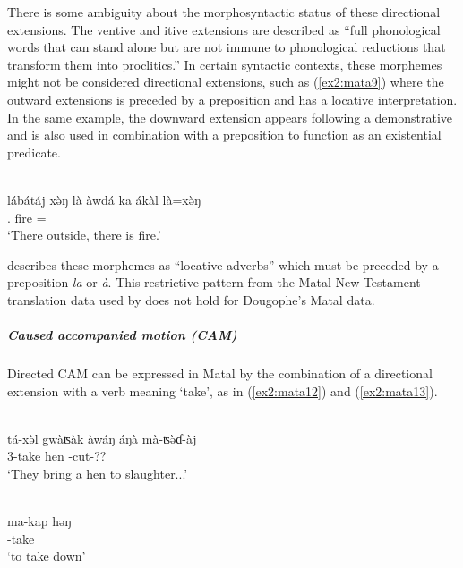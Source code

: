There is some ambiguity about the morphosyntactic status of these directional extensions. The ventive and itive extensions are described as ``full phonological words that can stand alone but are not immune to phonological reductions that transform them into proclitics.'' In certain syntactic contexts, these morphemes might not be considered directional extensions, such as (\ref{ex2:mata9}) where the outward extensions is preceded by a preposition and has a locative interpretation. In the same example, the downward extension appears following a demonstrative and is also used in combination with a preposition to function as an existential predicate. 

\ea\label{ex2:mata9}
 \\
\gll lábátáj xə̀ŋ là àwdá ka ákàl là=xə̀ŋ	\\
.     fire =		\\
\glt `There outside, there is fire.'
\z 

\citet[35]{verdizadeSelectedTopicsGrammar2018} describes these morphemes as ``locative adverbs'' which must be preceded by a preposition \textit{la} or \textit{à}. This restrictive pattern from the Matal New Testament translation data used by \citet[]{verdizadeSelectedTopicsGrammar2018} does not hold for Dougophe's Matal data. 

\subparagraph{Caused accompanied motion (CAM)}

Directed CAM can be expressed in Matal by the combination of a directional extension with a verb meaning `take', as in (\ref{ex2:mata12}) and (\ref{ex2:mata13}).

\ea\label{ex2:mata12}
 \\
\gll  tá-xə̀l gwàʦàk àwáŋ áŋà  mà-ʦə̀ɗ-àj 	\\
3-take hen   -cut-??		\\
\glt `They bring a hen to slaughter...'

\ex\label{ex2:mata13}
 \\
\gll ma-kap həŋ 		\\
-take  \\
\glt `to take down'
\z 

